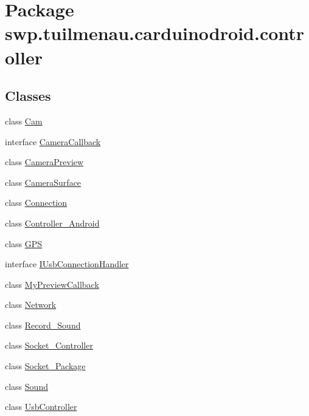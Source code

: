 \hypertarget{namespaceswp_1_1tuilmenau_1_1carduinodroid_1_1controller}{}\section{Package swp.\+tuilmenau.\+carduinodroid.\+controller}
\label{namespaceswp_1_1tuilmenau_1_1carduinodroid_1_1controller}
\subsection*{Classes}
\begin{DoxyCompactItemize}
\item 
class \hyperlink{classswp_1_1tuilmenau_1_1carduinodroid_1_1controller_1_1_cam}{Cam}
\item 
interface \hyperlink{interfaceswp_1_1tuilmenau_1_1carduinodroid_1_1controller_1_1_camera_callback}{Camera\+Callback}
\item 
class \hyperlink{classswp_1_1tuilmenau_1_1carduinodroid_1_1controller_1_1_camera_preview}{Camera\+Preview}
\item 
class \hyperlink{classswp_1_1tuilmenau_1_1carduinodroid_1_1controller_1_1_camera_surface}{Camera\+Surface}
\item 
class \hyperlink{classswp_1_1tuilmenau_1_1carduinodroid_1_1controller_1_1_connection}{Connection}
\item 
class \hyperlink{classswp_1_1tuilmenau_1_1carduinodroid_1_1controller_1_1_controller___android}{Controller\+\_\+\+Android}
\item 
class \hyperlink{classswp_1_1tuilmenau_1_1carduinodroid_1_1controller_1_1_g_p_s}{G\+P\+S}
\item 
interface \hyperlink{interfaceswp_1_1tuilmenau_1_1carduinodroid_1_1controller_1_1_i_usb_connection_handler}{I\+Usb\+Connection\+Handler}
\item 
class \hyperlink{classswp_1_1tuilmenau_1_1carduinodroid_1_1controller_1_1_my_preview_callback}{My\+Preview\+Callback}
\item 
class \hyperlink{classswp_1_1tuilmenau_1_1carduinodroid_1_1controller_1_1_network}{Network}
\item 
class \hyperlink{classswp_1_1tuilmenau_1_1carduinodroid_1_1controller_1_1_record___sound}{Record\+\_\+\+Sound}
\item 
class \hyperlink{classswp_1_1tuilmenau_1_1carduinodroid_1_1controller_1_1_socket___controller}{Socket\+\_\+\+Controller}
\item 
class \hyperlink{classswp_1_1tuilmenau_1_1carduinodroid_1_1controller_1_1_socket___package}{Socket\+\_\+\+Package}
\item 
class \hyperlink{classswp_1_1tuilmenau_1_1carduinodroid_1_1controller_1_1_sound}{Sound}
\item 
class \hyperlink{classswp_1_1tuilmenau_1_1carduinodroid_1_1controller_1_1_usb_controller}{Usb\+Controller}
\end{DoxyCompactItemize}

